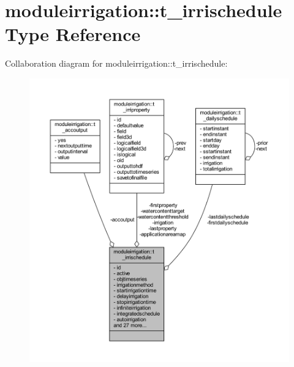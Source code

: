 \hypertarget{structmoduleirrigation_1_1t__irrischedule}{}\section{moduleirrigation\+:\+:t\+\_\+irrischedule Type Reference}
\label{structmoduleirrigation_1_1t__irrischedule}


Collaboration diagram for moduleirrigation\+:\+:t\+\_\+irrischedule\+:\nopagebreak
\begin{figure}[H]
\begin{center}
\leavevmode
\includegraphics[width=350pt]{structmoduleirrigation_1_1t__irrischedule__coll__graph}
\end{center}
\end{figure}
